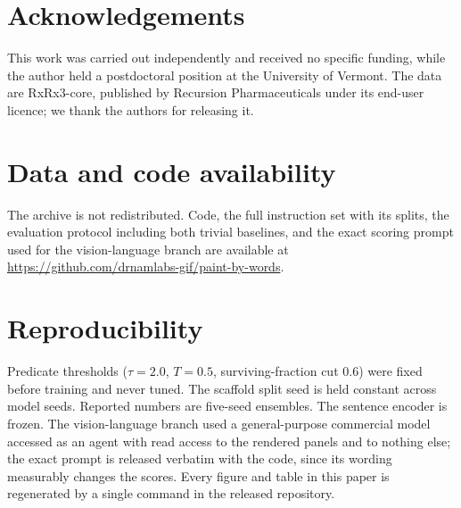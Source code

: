 \documentclass[11pt]{article}
\begin{document}
\section*{Acknowledgements}

This work was carried out independently and received no specific funding, while the
author held a postdoctoral position at the University of Vermont. The data
are RxRx3-core, published by Recursion Pharmaceuticals under its end-user licence; we
thank the authors for releasing it.

\section*{Data and code availability}

The archive is not redistributed. Code, the full instruction set with its splits, the
evaluation protocol including both trivial baselines, and the exact scoring prompt used
for the vision-language branch are available at
\url{https://github.com/drnamlabs-gif/paint-by-words}.

\appendix
\section{Reproducibility}

Predicate thresholds ($\tau = 2.0$, $T = 0.5$, surviving-fraction cut $0.6$) were fixed
before training and never tuned. The scaffold split seed is held constant across model
seeds. Reported numbers are five-seed ensembles. The sentence encoder is frozen. The
vision-language branch used a general-purpose commercial model accessed as an agent with
read access to the rendered panels and to nothing else; the exact prompt is released
verbatim with the code, since its wording measurably changes the scores. Every figure and
table in this paper is regenerated by a single command in the released repository.



\end{document}
